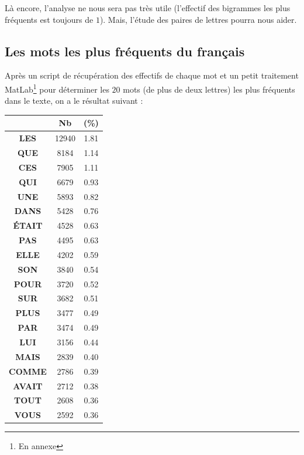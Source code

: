 \documentclass[a4paper, titlepage]{livret}
\begin{document}
Là encore, l'analyse ne nous sera pas très utile (l'effectif des bigrammes les plus fréquents est toujours de $1$).
Mais, l'étude des paires de lettres pourra nous aider.

\newpage
\subsection{Les mots les plus fréquents du français}

Après un script de récupération des effectifs de chaque mot et un petit traitement MatLab\footnote{En annexe} pour déterminer les $20$ mots (de plus de deux lettres) les plus fréquents dans le texte, on a le résultat suivant :\\

\begin{center}
\begin{tabular}{|c|c|c|}
 \hline
	& \textbf{Nb} & \textbf{(\%)}\\
	\hline
		\textbf{LES} &   12940 &  1.81\\
	\hline
	\textbf{QUE} &    8184 &  1.14\\
	\hline
	\textbf{CES} &    7905 &  1.11\\
	\hline
	\textbf{QUI} &    6679 &  0.93\\
	\hline
	\textbf{UNE} &    5893 &  0.82\\
	\hline
	\textbf{DANS} &    5428 &  0.76\\
	\hline
	\textbf{ÉTAIT} &    4528 &  0.63\\
	\hline
	\textbf{PAS} &    4495 &  0.63\\
	\hline
	\textbf{ELLE} &    4202 &  0.59\\
	\hline
	\textbf{SON} &    3840 &  0.54\\
	\hline
	\textbf{POUR} &    3720 &  0.52\\
	\hline
	\textbf{SUR} &    3682 &  0.51\\
	\hline
	\textbf{PLUS} &    3477 &  0.49\\
	\hline
	\textbf{PAR} &    3474 &  0.49\\
	\hline
	\textbf{LUI} &    3156 &  0.44\\
	\hline
	\textbf{MAIS} &    2839 &  0.40\\
	\hline
	\textbf{COMME} &    2786 &  0.39\\
	\hline
	\textbf{AVAIT} &    2712 &  0.38\\
	\hline
	\textbf{TOUT} &    2608 &  0.36\\
	\hline
	\textbf{VOUS} &    2592 &  0.36\\
	\hline
\end{tabular}
  \label{tab74}
\end{center}
\end{document}
